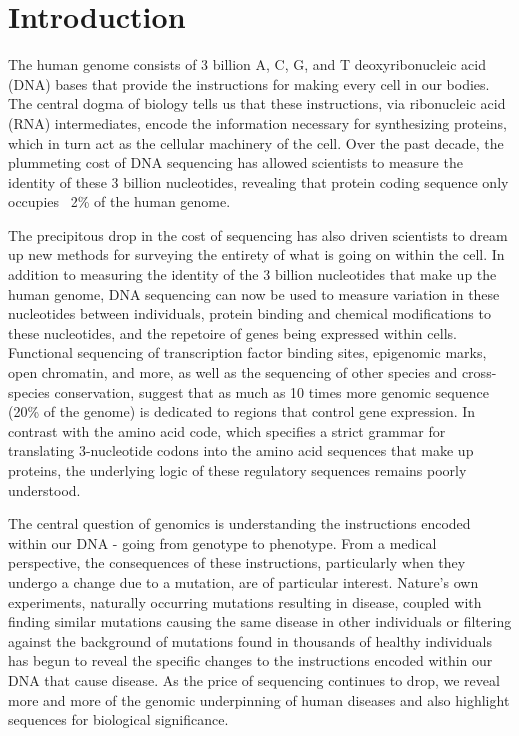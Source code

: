 \chapter{Introduction}
\label{chap:intro}

The human genome consists of 3 billion A, C, G, and T deoxyribonucleic acid (DNA) bases that provide the instructions for making every cell in our bodies. The central dogma of biology tells us that these instructions, via ribonucleic acid (RNA) intermediates, encode the information necessary for synthesizing proteins, which in turn act as the cellular machinery of the cell. Over the past decade, the plummeting cost of DNA sequencing has allowed scientists to measure the identity of these 3 billion nucleotides, revealing that protein coding sequence only occupies ~2\% of the human genome.

The precipitous drop in the cost of sequencing has also driven scientists to dream up new methods for surveying the entirety of what is going on within the cell. In addition to measuring the identity of the 3 billion nucleotides that make up the human genome, DNA sequencing can now be used to measure variation in these nucleotides between individuals, protein binding and chemical modifications to these nucleotides, and the repetoire of genes being expressed within cells. Functional sequencing of transcription factor binding sites, epigenomic marks, open chromatin, and more, as well as the sequencing of other species and cross-species conservation, suggest that as much as 10 times more genomic sequence (20\% of the genome) is dedicated to regions that control gene expression. In contrast with the amino acid code, which specifies a strict grammar for translating 3-nucleotide codons into the amino acid sequences that make up proteins, the underlying logic of these regulatory sequences remains poorly understood.

The central question of genomics is understanding the instructions encoded within our DNA - going from genotype to phenotype. From a medical perspective, the consequences of these instructions, particularly when they undergo a change due to a mutation, are of particular interest. Nature's own experiments, naturally occurring mutations resulting in disease, coupled with finding similar mutations causing the same disease in other individuals or filtering against the background of mutations found in thousands of healthy individuals has begun to reveal the specific changes to the instructions encoded within our DNA that cause disease. As the price of sequencing continues to drop, we reveal more and more of the genomic underpinning of human diseases and also highlight sequences for biological significance.

